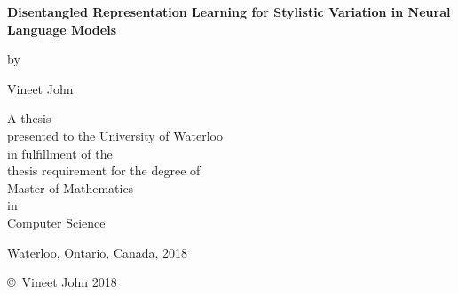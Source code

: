 \pagestyle{empty}

\begin{titlepage}
	\begin{center}
		\vspace*{1.0cm}

		\Huge
		{\bf Disentangled Representation Learning for Stylistic Variation in Neural Language Models}

		\vspace*{1.0cm}

		\normalsize
		by \\

		\vspace*{1.0cm}

		\Large
		Vineet John \\

		\vspace*{3.0cm}

		\normalsize
		A thesis \\
		presented to the University of Waterloo \\
		in fulfillment of the \\
		thesis requirement for the degree of \\
		Master of Mathematics \\
		in \\
		Computer Science \\

		\vspace*{2.0cm}

		Waterloo, Ontario, Canada, 2018 \\

		\vspace*{1.0cm}

		\copyright\ Vineet John 2018 \\
	\end{center}
\end{titlepage}

\pagestyle{plain}
\setcounter{page}{2}

\cleardoublepage %

